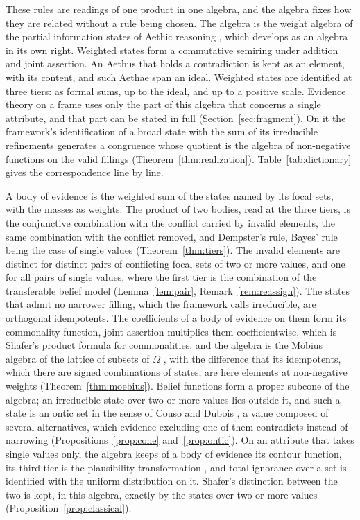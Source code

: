 These rules are readings of one product in one algebra, and the algebra fixes how they are related without a rule being chosen. The algebra is the weight algebra of the partial information states of Aethic reasoning \cite{Aethus}, which \cite{AethusTree} develops as an algebra in its own right. Weighted states form a commutative semiring under addition and joint assertion. An Aethus that holds a contradiction is kept as an element, with its content, and such Aethae span an ideal. Weighted states are identified at three tiers: as formal sums, up to the ideal, and up to a positive scale. Evidence theory on a frame uses only the part of this algebra that concerns a single attribute, and that part can be stated in full (Section~\ref{sec:fragment}). On it the framework's identification of a broad state with the sum of its irreducible refinements generates a congruence whose quotient is the algebra of non-negative functions on the valid fillings (Theorem~\ref{thm:realization}). Table~\ref{tab:dictionary} gives the correspondence line by line.

A body of evidence is the weighted sum of the states named by its focal sets, with the masses as weights. The product of two bodies, read at the three tiers, is the conjunctive combination with the conflict carried by invalid elements, the same combination with the conflict removed, and Dempster's rule, Bayes' rule being the case of single values (Theorem~\ref{thm:tiers}). The invalid elements are distinct for distinct pairs of conflicting focal sets of two or more values, and one for all pairs of single values, where the first tier is the combination of the transferable belief model (Lemma~\ref{lem:pair}, Remark~\ref{rem:reassign}). The states that admit no narrower filling, which the framework calls irreducible, are orthogonal idempotents. The coefficients of a body of evidence on them form its commonality function, joint assertion multiplies them coefficientwise, which is Shafer's product formula for commonalities, and the algebra is the M\"obius algebra of the lattice of subsets of $\Omega$ \cite{solomon1967, greene1973}, with the difference that its idempotents, which there are signed combinations of states, are here elements at non-negative weights (Theorem~\ref{thm:moebius}). Belief functions form a proper subcone of the algebra; an irreducible state over two or more values lies outside it, and such a state is an ontic set in the sense of Couso and Dubois \cite{couso2014}, a value composed of several alternatives, which evidence excluding one of them contradicts instead of narrowing (Propositions~\ref{prop:cone} and~\ref{prop:ontic}). On an attribute that takes single values only, the algebra keeps of a body of evidence its contour function, its third tier is the plausibility transformation \cite{voorbraak1989, cobb2006}, and total ignorance over a set is identified with the uniform distribution on it. Shafer's distinction between the two \cite{shafer1976} is kept, in this algebra, exactly by the states over two or more values (Proposition~\ref{prop:classical}).

